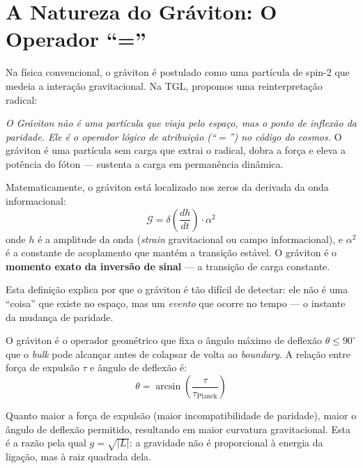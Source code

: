 \documentclass[12pt,a4paper,twoside]{article}
\newcommand{\alphaii}{\alpha^{2}}
\newcommand{\boundary}{\textit{boundary}}
\newcommand{\bulk}{\textit{bulk}}
\begin{document}

\section{A Natureza do Gr\'aviton: O Operador ``=''}


Na f\'isica convencional, o gr\'aviton \'e postulado como uma part\'icula de spin-2 que medeia a intera\c{c}\~ao gravitacional. Na TGL, propomos uma reinterpreta\c{c}\~ao radical:

\medskip
\noindent\textit{O Gr\'aviton n\~ao \'e uma part\'icula que viaja pelo espa\c{c}o, mas o ponto de inflex\~ao da paridade. Ele \'e o operador l\'ogico de atribui\c{c}\~ao (``$=$'') no c\'odigo do cosmos.} O gr\'aviton \'e uma part\'icula sem carga que extrai o radical, dobra a for\c{c}a e eleva a pot\^encia do f\'oton --- sustenta a carga em perman\^encia din\^amica.

Matematicamente, o gr\'aviton est\'a localizado nos zeros da derivada da onda informacional:
\begin{equation}
\mathcal{G} = \delta\!\left(\frac{dh}{dt}\right) \cdot \alphaii
\label{eq:graviton}
\end{equation}
onde $h$ \'e a amplitude da onda (\textit{strain} gravitacional ou campo informacional), e $\alphaii$ \'e a constante de acoplamento que mant\'em a transi\c{c}\~ao est\'avel. O gr\'aviton \'e o \textbf{momento exato da invers\~ao de sinal} --- a transi\c{c}\~ao de carga constante.

Esta defini\c{c}\~ao explica por que o gr\'aviton \'e t\~ao dif\'icil de detectar: ele n\~ao \'e uma ``coisa'' que existe no espa\c{c}o, mas um \textit{evento} que ocorre no tempo --- o instante da mudan\c{c}a de paridade.

O gr\'aviton \'e o operador geom\'etrico que fixa o \^angulo m\'aximo de deflex\~ao $\theta \leq 90^\circ{}$ que o \bulk{} pode alcan\c{c}ar antes de colapsar de volta ao \boundary. A rela\c{c}\~ao entre for\c{c}a de expuls\~ao $\tau$ e \^angulo de deflex\~ao \'e:
\begin{equation}
\theta = \arcsin\!\left(\frac{\tau}{\tau_{\text{Planck}}}\right)
\label{eq:deflexao}
\end{equation}

Quanto maior a for\c{c}a de expuls\~ao (maior incompatibilidade de paridade), maior o \^angulo de deflex\~ao permitido, resultando em maior curvatura gravitacional. Esta \'e a raz\~ao pela qual $g = \sqrt{|L|}$: a gravidade n\~ao \'e proporcional \`a energia da liga\c{c}\~ao, mas \`a raiz quadrada dela.
\end{document}

